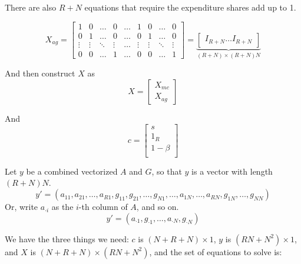 \documentclass[12pt]{article}
\begin{document}
There are also $R+N$ equations that require the expenditure shares add up to 1.

\[
X_{ag} = 
\begin{bmatrix}
    1 & 0 &\dots  & 0 & \dots & 1 & 0 & \dots & 0\\
    0 & 1 &\dots  & 0 & \dots & 0 & 1 &\dots  & 0\\
    \vdots & \vdots & \ddots & \vdots & \dots & \vdots & \vdots & \ddots & \vdots \\
    0 & 0 & \dots  & 1 & \dots & 0 & 0 &\dots  & 1
\end{bmatrix} = 
\underbrace{\begin{bmatrix}
I_{R+N} \ldots I_{R+N}
\end{bmatrix}}_{(R+N) \times (R+N) N}
\]



And then construct $X$ as
\[
X = 
\begin{bmatrix}
X_{mc} \\
X_{ag}
\end{bmatrix}
\]

And 
\[
c = 
\begin{bmatrix}
s \\
1_R \\
1 -\beta \\
\end{bmatrix}
\]

Let $y$ be a combined vectorized $A$ and $G$, so that $y$ is a vector with length $(R + N) N$. 
\[ 
y' = (a_{11},a_{21},\ldots,a_{R1},g_{11},g_{21},\ldots,g_{N1},\ldots,a_{1N},\ldots,a_{RN},g_{1N},\ldots,g_{NN}) 
\]
Or, write $a_{\cdot i}$ as the $i$-th column of $A$, and so on.
\[ 
y' = (a_{\cdot 1},g_{ \cdot 1},\ldots,a_{ \cdot N},g_{ \cdot N})
\]

We have the three things we need: $c$ is $(N + R + N) \times 1$, $y$ is $(RN + N^2)\times 1$, and $X$ is $(N+R+N)\times (RN + N^2)$, and the set of equations to solve is:
\end{document}
